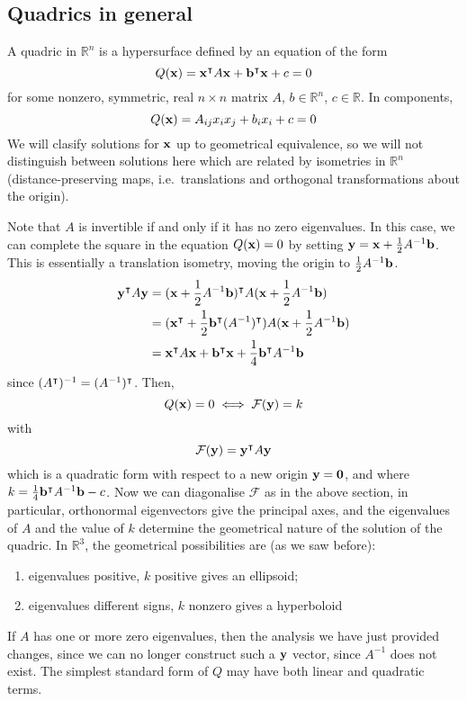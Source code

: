 \subsection{Quadrics in general}
A quadric in \(\mathbb R^n\) is a hypersurface defined by an equation of the form
\[
	Q(\vb x) = \vb x^\intercal A \vb x + \vb b^\intercal \vb x + c = 0
\]
for some nonzero, symmetric, real \(n \times n\) matrix \(A\), \(b \in \mathbb R^n\), \(c \in \mathbb R\).
In components,
\[
	Q(\vb x) = A_{ij}x_i x_j + b_i x_i + c = 0
\]
We will clasify solutions for \(\vb x\) up to geometrical equivalence, so we will not distinguish between solutions here which are related by isometries in \(\mathbb R^n\) (distance-preserving maps, i.e.\ translations and orthogonal transformations about the origin).

Note that \(A\) is invertible if and only if it has no zero eigenvalues.
In this case, we can complete the square in the equation \(Q(\vb x) = 0\) by setting \(\vb y = \vb x + \frac{1}{2}A^{-1} \vb b\).
This is essentially a translation isometry, moving the origin to \(\frac{1}{2}A^{-1} \vb b\).
\begin{align*}
	\vb y^\intercal A \vb y & = (\vb x + \frac{1}{2}A^{-1}\vb b)^\intercal A (\vb x + \frac{1}{2}A^{-1}\vb b)                         \\
	                         & = (\vb x^\intercal + \frac{1}{2}\vb b^\intercal(A^{-1})^\intercal) A (\vb x + \frac{1}{2}A^{-1}\vb b) \\
	                         & = \vb x^\intercal A \vb x + \vb b^\intercal \vb x + \frac{1}{4}\vb b^\intercal A^{-1}\vb b
\end{align*}
since \((A^\intercal)^{-1} = (A^{-1})^\intercal\).
Then,
\[
	Q(\vb x) = 0 \iff \mathcal F(\vb y) = k
\]
with
\[
	\mathcal F(\vb y) = \vb y^\intercal A \vb y
\]
which is a quadratic form with respect to a new origin \(\vb y = \vb 0\), and where \(k = \frac{1}{4}\vb b^\intercal A^{-1}\vb b - c\).
Now we can diagonalise \(\mathcal F\) as in the above section, in particular, orthonormal eigenvectors give the principal axes, and the eigenvalues of \(A\) and the value of \(k\) determine the geometrical nature of the solution of the quadric.
In \(\mathbb R^3\), the geometrical possibilities are (as we saw before):
\begin{enumerate}
	\item eigenvalues positive, \(k\) positive gives an ellipsoid;
	\item eigenvalues different signs, \(k\) nonzero gives a hyperboloid
\end{enumerate}
If \(A\) has one or more zero eigenvalues, then the analysis we have just provided changes, since we can no longer construct such a \(\vb y\) vector, since \(A^{-1}\) does not exist.
The simplest standard form of \(Q\) may have both linear and quadratic terms.

